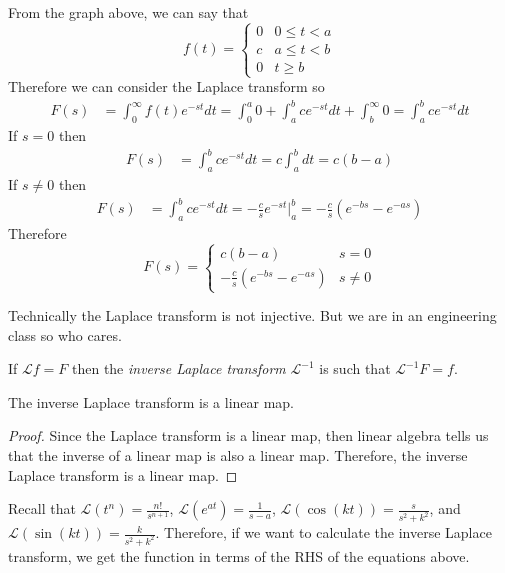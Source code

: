 \documentclass[notes]{subfiles}
\begin{document}
\begin{solution}
    From the graph above, we can say that
    \[
        f(t) = \begin{cases}
            0 & 0 \leq t < a \\
            c & a \leq t < b \\
            0 & t \geq b
        \end{cases}
    \]
    Therefore we can consider the Laplace transform so
    \begin{align*}
        F(s)
        &= \int_0^\infty f(t)e^{-st}dt
        = \int_0^a 0 + \int_a^b ce^{-st}dt + \int_b^\infty 0
        = \int_a^b ce^{-st}dt
    \end{align*}
    If $s = 0$ then
    \begin{align*}
        F(s)
        &= \int_a^b ce^{-st}dt
        = c\int_a^b dt
        = c(b - a)
    \end{align*}
    If $s \neq 0$ then
    \begin{align*}
        F(s)
        &= \int_a^b ce^{-st}dt
        = -\frac{c}{s}e^{-st}\Big|_a^b
        = -\frac{c}{s}(e^{-bs} - e^{-as})
    \end{align*}
    Therefore
    \[
        F(s) = \begin{cases}
            c(b - a) & s = 0 \\
            -\frac{c}{s}(e^{-bs} - e^{-as}) & s \neq 0
        \end{cases}
    \]
\end{solution}

Technically the Laplace transform is not injective. But we are in an engineering class so who cares.
\begin{definition}
    If $\mathcal{L}f = F$ then the \textit{inverse Laplace transform} $\mathcal{L}^{-1}$ is such that $\mathcal{L}^{-1}F = f$.
\end{definition}

\begin{lemma}
    The inverse Laplace transform is a linear map.
\end{lemma}
\begin{proof}
    Since the Laplace transform is a linear map, then linear algebra tells us that the inverse of a linear map is also a linear map. Therefore, the inverse Laplace transform is a linear map.
\end{proof}

Recall that $\mathcal{L}(t^n) = \frac{n!}{s^{n + 1}}$, $\mathcal{L}(e^{at}) = \frac{1}{s - a}$, $\mathcal{L}(\cos(kt)) = \frac{s}{s^2 + k^2}$, and $\mathcal{L}(\sin(kt)) = \frac{k}{s^2 + k^2}$. Therefore, if we want to calculate the inverse Laplace transform, we get the function in terms of the RHS of the equations above.
\end{document}
